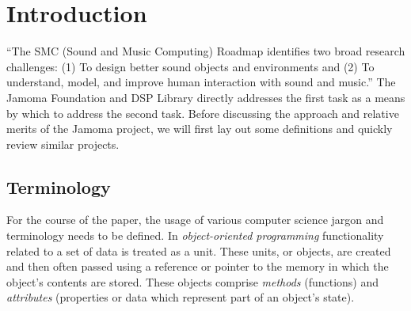 \documentclass[twoside,10pt]{article}
\affiliation{\paperauthorA}
  {74 Objects LLC\\ Kansas City, USA \\ {\tt \href{mailto:tim@74objects.com}{tim@74objects.com}}}
\title{\papertitle}
\begin{document}
\sloppy
{} %
    
\maketitle


\begin{abstract}

This paper presents an object-oriented, reflective, application framework for C++, with an emphasis on real-time signal processing. 
The Jamoma Foundation and DSP Library provide a runtime environment and an expanding collection of unit generators for synthesis, processing, and analysis.  It makes use of polymorphic typing, dynamic binding, and introspection to create a cross-platform API pulling ideas from languages such as Smalltalk and Objective-C while remaining within the bounds of the portable and cross-platform C++ context. 
Over the past several years this library has been used in both open source and commercial software projects in the sound and music computing field.

\end{abstract}



\section{Introduction} %
\label{sec:introduction}

``The SMC (Sound and Music Computing) Roadmap identifies two broad research challenges: (1) To design better sound objects and environments and (2) To understand, model, and improve human interaction with sound and music.'' \cite{serra:2007}  The Jamoma Foundation and DSP Library directly addresses the first task as a means by which to address the second task.  Before discussing the approach and relative merits of the Jamoma project, we will first lay out some definitions and quickly review similar projects.


\subsection{Terminology} %

For the course of the paper, the usage of various computer science jargon and terminology needs to be defined.  In \emph{object-oriented programming} functionality related to a set of data is treated as a unit.  These units, or objects, are created and then often passed using a reference or pointer to the memory in which the object's contents are stored.  These objects comprise \emph{methods} (functions) and \emph{attributes} (properties or data which represent part of an object's state).
\end{document}
